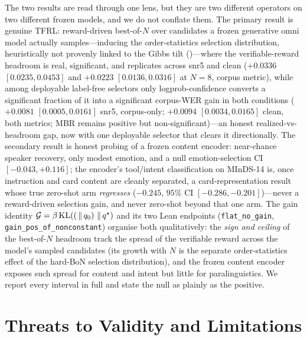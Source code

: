 The two results are read through one lens, but they are two different operators on two different frozen models, and we do not conflate them. The primary result is genuine TFRL: reward-driven best-of-$N$ over candidates a frozen generative omni model actually samples---inducing the order-statistics selection distribution, heuristically not provenly linked to the Gibbs tilt ()---where the verifiable-reward headroom is real, significant, and replicates across snr5 and clean ($+0.0336$ $[0.0235,0.0453]$ and $+0.0223$ $[0.0136,0.0316]$ at $N{=}8$, corpus metric), while among deployable label-free selectors only logprob-confidence converts a significant fraction of it into a significant corpus-WER gain in both conditions ($+0.0081$ $[0.0005,0.0161]$ snr5, corpus-only; $+0.0094$ $[0.0034,0.0165]$ clean, both metrics; MBR remains positive but non-significant)---an honest realized-vs-headroom gap, now with one deployable selector that clears it directionally. The secondary result is honest probing of a frozen content encoder: near-chance speaker recovery, only modest emotion, and a null emotion-selection CI $[-0.043,+0.116]$; the encoder's tool/intent classification on MInDS-14 is, once instruction and card content are cleanly separated, a card-representation result whose true zero-shot arm \emph{regresses} ($-0.245$, $95\%$ CI $[-0.286,-0.201]$)---never a reward-driven selection gain, and never zero-shot beyond that one arm. The gain identity $\mathcal{G}=\beta\,\mathrm{KL}\!\left(( \,\|\, q_{0}\right)\,\|\,q^{\star})$ and its two Lean endpoints (\texttt{flat\_no\_gain}, \texttt{gain\_pos\_of\_nonconstant}) organise both qualitatively: the \emph{sign and ceiling} of the best-of-$N$ headroom track the spread of the verifiable reward across the model's sampled candidates (its growth with $N$ is the separate order-statistics effect of the hard-BoN selection distribution), and the frozen content encoder exposes such spread for content and intent but little for paralinguistics. We report every interval in full and state the null as plainly as the positive.

\section{Threats to Validity and Limitations}
\label{sec:threats}


